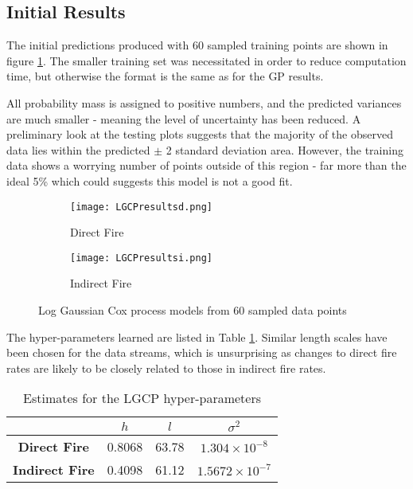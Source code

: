 \documentclass[a4paper,11pt]{report}
\begin{document}

\subsection{Initial Results}

The initial predictions produced with 60 sampled training points are shown in figure \ref{fig:LGCPresults}. The smaller training set was necessitated in order to reduce computation time, but otherwise the format is the same as for the GP results. \par

All probability mass is assigned to positive numbers, and the predicted variances are much smaller - meaning the level of uncertainty has been reduced. A preliminary look at the testing plots suggests that the majority of the observed  data lies within the predicted \(\pm\) 2 standard deviation area. However, the training data shows a worrying number of points outside of this region - far more than the ideal 5\% which could suggests this model is not a good fit. 

\par
\begin{figure}
\centering
\begin{subfigure}{.5\textwidth}
	\centering
	\texttt{[image: LGCPresultsd.png]}
  	\caption{Direct Fire}
\end{subfigure}%
\begin{subfigure}{.5\textwidth}
  	\centering
  	\texttt{[image: LGCPresultsi.png]}
  	\caption{Indirect Fire}
\end{subfigure}
\caption{Log Gaussian Cox process models from 60 sampled data points}
\label{fig:LGCPresults}
\end{figure}

The hyper-parameters learned are listed in Table \ref{LGCPhyperparameters}. Similar length scales have been chosen for the data streams, which is unsurprising as changes to direct fire rates are likely to be closely related to those in indirect fire rates. 


\singlespacing
\begin{table}[]
\centering
\caption{Estimates for the LGCP hyper-parameters}
\label{LGCPhyperparameters}
\begin{tabular}{c|c|c|c|}
\cline{2-4}
\textbf{}                                    & \(h\) & \(l\) & \(\sigma^2\) \\ \hline
\multicolumn{1}{|c|}{\textbf{Direct Fire}}   & 0.8068          & 63.78          & \(1.304\times 10^{-8}\)              \\ \hline
\multicolumn{1}{|c|}{\textbf{Indirect Fire}} & 0.4098          & 61.12          & \(1.5672\times 10^{-7}\)              \\ \hline
\end{tabular}
\end{table}
\doublespacing
\end{document}
